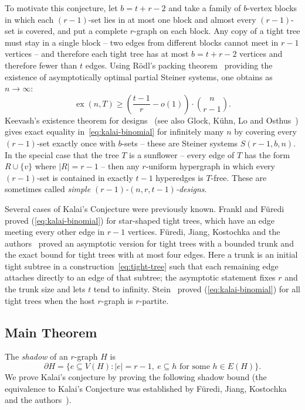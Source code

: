 \documentclass[11pt]{article}
\theoremstyle{remark}
\numberwithin{equation}{section}
\DeclareMathOperator{\ex}{ex}
\newcommand{\sh}{\partial}
\begin{document}
	To motivate this conjecture, let $b = t + r - 2$ and take a family of $b$-vertex blocks in which each $(r-1)$-set
	lies in at most one block and almost every $(r-1)$-set is covered,
	and put a complete $r$-graph on each block. Any copy of a tight tree
	must stay in a single block -- two edges from different blocks cannot
	meet in $r-1$ vertices -- and therefore each tight tree has at most $b = t + r - 2$ vertices and therefore fewer than $t$ edges. Using
	R\"odl's packing theorem~\cite{Rodl} providing the existence of asymptotically optimal partial Steiner systems, one obtains as $n \rightarrow \infty$:
	\[
	\ex(n,T)\ge\left(\frac{t-1}{r}-o(1)\right) \cdot \binom{n}{r-1}.
	\]
	Keevash's existence theorem for designs~\cite{Keevash} (see also Glock, K\"{u}hn, Lo and Osthus~\cite{GKLO}) gives exact
	equality in~\eqref{eq:kalai-binomial} for infinitely many $n$ by
	covering every $(r-1)$-set exactly once with $b$-sets -- these are Steiner systems $S(r-1,b,n)$. In the special case that the tree $T$ is a sunflower -- every edge of $T$ has the form $R \cup \{v\}$ where $|R| = r - 1$ -- then any $r$-uniform hypergraph in which every $(r - 1)$-set is contained in exactly $t - 1$ hyperedges is $T$-free. These are sometimes called \emph{simple $(r - 1)$-$(n,r,t-1)$-designs}.
	
	
	Several cases of Kalai's Conjecture were previously known. Frankl
	and F\"uredi~\cite{FF} proved (\ref{eq:kalai-binomial}) for star-shaped tight
	trees, which have an edge meeting every other edge in $r-1$ vertices.
	F\"uredi, Jiang, Kostochka and the authors~\cite{FJKMVtrunk}
	proved an asymptotic version for tight trees with a bounded trunk and
	the exact bound for tight trees with at most four edges. Here a trunk
	is an initial tight subtree in a construction~\eqref{eq:tight-tree}
	such that each remaining edge attaches directly to an edge of that
	subtree; the asymptotic statement fixes $r$ and the trunk size and
	lets $t$ tend to infinity. Stein~\cite{Stein} proved (\ref{eq:kalai-binomial})
	for all tight trees when the host $r$-graph is $r$-partite.
	
	\subsection{Main Theorem}
	
	The \emph{shadow} of an $r$-graph $H$ is
	\[
	\sh H=\{e\subseteq V(H):|e|=r-1,\ e\subseteq h
	\text{ for some }h\in E(H)\}.
	\]
	We prove  Kalai's
	conjecture by proving the following shadow bound  (the equivalence to Kalai's Conjecture was established by F\"uredi, Jiang, Kostochka and the authors~\cite[Proposition 2.2]{FJKMVtrunk}).
	
\end{document}
